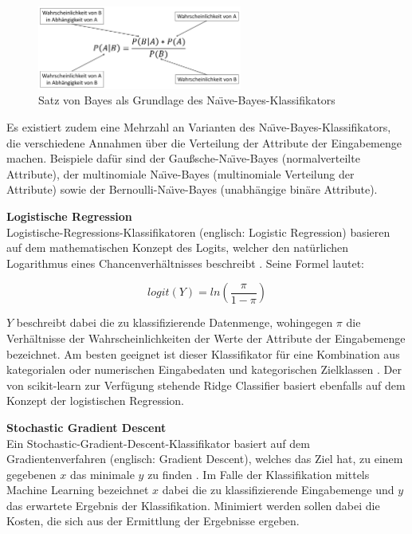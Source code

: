 \begin{figure}[t]
    \centering
    \includegraphics[width=0.6\textwidth]{images/NB}
    \caption{Satz von Bayes als Grundlage des Na\"{\i}ve-Bayes-Klassifikators\label{fig:nb}}
\end{figure}

Es existiert zudem eine Mehrzahl an Varianten des Na\"{\i}ve-Bayes-Klassifikators, die verschiedene Annahmen über die Verteilung der Attribute der Eingabemenge machen. Beispiele dafür sind der Gaußsche-Na\"{\i}ve-Bayes (normalverteilte Attribute), der multinomiale Na\"{\i}ve-Bayes (multinomiale Verteilung der Attribute) sowie der Bernoulli-Na\"{\i}ve-Bayes (unabhängige binäre Attribute).

\textbf{Logistische Regression\medskip}\\
Logistische-Regressions-Klassifikatoren (englisch: Logistic Regression) basieren auf dem mathematischen Konzept des Logits, welcher den natürlichen Logarithmus eines Chancenverhältnisses beschreibt \cite{Peng2002}. Seine Formel lautet:

\[logit(Y) = ln(\frac{\pi}{1-\pi})\]

$Y$ beschreibt dabei die zu klassifizierende Datenmenge, wohingegen $\pi$ die Verhältnisse der Wahrscheinlichkeiten der Werte der Attribute der Eingabemenge bezeichnet. Am besten geeignet ist dieser Klassifikator für eine Kombination aus kategorialen oder numerischen Eingabedaten und kategorischen Zielklassen \cite{Peng2002}. Der von scikit-learn zur Verfügung stehende Ridge Classifier basiert ebenfalls auf dem Konzept der logistischen Regression.

\textbf{Stochastic Gradient Descent\medskip}\\
Ein Stochastic-Gradient-Descent-Klassifikator basiert auf dem Gradientenverfahren (englisch: Gradient Descent), welches das Ziel hat, zu einem gegebenen $x$ das minimale $y$ zu finden \cite{Srinivasan2019}. Im Falle der Klassifikation mittels Machine Learning bezeichnet $x$ dabei die zu klassifizierende Eingabemenge und $y$ das erwartete Ergebnis der Klassifikation. Minimiert werden sollen dabei die \glqq Kosten\grqq{}, die sich aus der Ermittlung der Ergebnisse ergeben.

